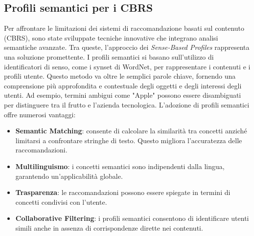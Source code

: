 \documentclass{report}
\begin{document}
	\subsection{Profili semantici per i CBRS}
	Per affrontare le limitazioni dei sistemi di raccomandazione basati sul contenuto (CBRS), sono state sviluppate tecniche innovative che integrano analisi semantiche avanzate. Tra queste, l'approccio dei \textit{Sense-Based Profiles} rappresenta una soluzione promettente.	I profili semantici si basano sull'utilizzo di identificatori di senso, come i synset di WordNet, per rappresentare i contenuti e i profili utente. Questo metodo va oltre le semplici parole chiave, fornendo una comprensione più approfondita e contestuale degli oggetti e degli interessi degli utenti. Ad esempio, termini ambigui come "Apple" possono essere disambiguati per distinguere tra il frutto e l'azienda tecnologica.
	L'adozione di profili semantici offre numerosi vantaggi:
	\begin{itemize}
		\item \textbf{Semantic Matching}: consente di calcolare la similarità tra concetti anziché limitarsi a confrontare stringhe di testo. Questo migliora l'accuratezza delle raccomandazioni.
		\item \textbf{Multilinguismo}: i concetti semantici sono indipendenti dalla lingua, garantendo un'applicabilità globale.
		\item \textbf{Trasparenza}: le raccomandazioni possono essere spiegate in termini di concetti condivisi con l'utente.
		\item \textbf{Collaborative Filtering}: i profili semantici consentono di identificare utenti simili anche in assenza di corrispondenze dirette nei contenuti.
	\end{itemize}
\end{document}
